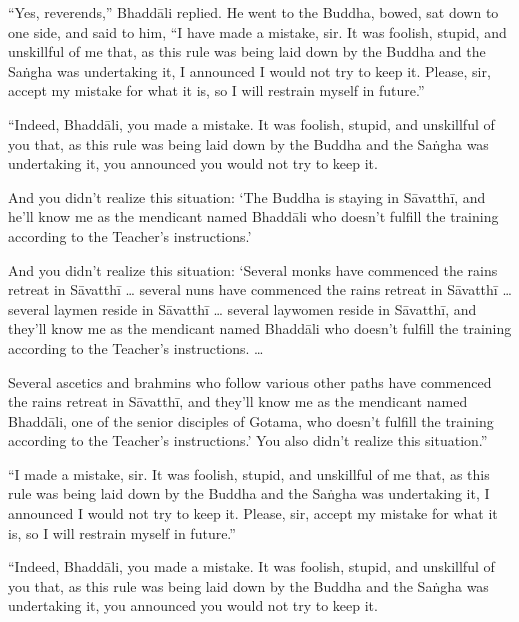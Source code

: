 \documentclass[12pt,openany]{book}%
\begin{document}
“Yes, reverends,” \textsanskrit{Bhaddāli} replied. He went to the Buddha, bowed, sat down to one side, and said to him, “I have made a mistake, sir. It was foolish, stupid, and unskillful of me that, as this rule was being laid down by the Buddha and the \textsanskrit{Saṅgha} was undertaking it, I announced I would not try to keep it. Please, sir, accept my mistake for what it is, so I will restrain myself in future.” 

“Indeed, \textsanskrit{Bhaddāli}, you made a mistake. It was foolish, stupid, and unskillful of you that, as this rule was being laid down by the Buddha and the \textsanskrit{Saṅgha} was undertaking it, you announced you would not try to keep it. 

And you didn’t realize this situation: ‘The Buddha is staying in \textsanskrit{Sāvatthī}, and he’ll know me as the mendicant named \textsanskrit{Bhaddāli} who doesn’t fulfill the training according to the Teacher’s instructions.’ 

And you didn’t realize this situation: ‘Several monks have commenced the rains retreat in \textsanskrit{Sāvatthī} … several nuns have commenced the rains retreat in \textsanskrit{Sāvatthī} … several laymen reside in \textsanskrit{Sāvatthī} … several laywomen reside in \textsanskrit{Sāvatthī}, and they’ll know me as the mendicant named \textsanskrit{Bhaddāli} who doesn’t fulfill the training according to the Teacher’s instructions. … 

Several ascetics and brahmins who follow various other paths have commenced the rains retreat in \textsanskrit{Sāvatthī}, and they’ll know me as the mendicant named \textsanskrit{Bhaddāli}, one of the senior disciples of Gotama, who doesn’t fulfill the training according to the Teacher’s instructions.’ You also didn’t realize this situation.” 

“I made a mistake, sir. It was foolish, stupid, and unskillful of me that, as this rule was being laid down by the Buddha and the \textsanskrit{Saṅgha} was undertaking it, I announced I would not try to keep it. Please, sir, accept my mistake for what it is, so I will restrain myself in future.” 

“Indeed, \textsanskrit{Bhaddāli}, you made a mistake. It was foolish, stupid, and unskillful of you that, as this rule was being laid down by the Buddha and the \textsanskrit{Saṅgha} was undertaking it, you announced you would not try to keep it. 
\end{document}
